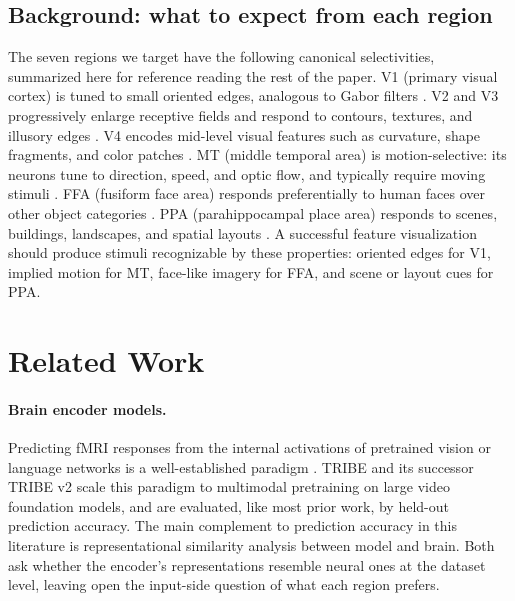 \documentclass{article}
\begin{document}
\subsection{Background: what to expect from each region}
The seven regions we target have the following canonical selectivities, summarized here for reference reading the rest of the paper. V1 (primary visual cortex) is tuned to small oriented edges, analogous to Gabor filters \citep{hubel1962receptive}. V2 and V3 progressively enlarge receptive fields and respond to contours, textures, and illusory edges \citep{hegde2000selectivity}. V4 encodes mid-level visual features such as curvature, shape fragments, and color patches \citep{pasupathy2002population}. MT (middle temporal area) is motion-selective: its neurons tune to direction, speed, and optic flow, and typically require moving stimuli \citep{maunsell1983functional,born2005structure}. FFA (fusiform face area) responds preferentially to human faces over other object categories \citep{kanwisher1997fusiform}. PPA (parahippocampal place area) responds to scenes, buildings, landscapes, and spatial layouts \citep{epstein1998cortical}. A successful feature visualization should produce stimuli recognizable by these properties: oriented edges for V1, implied motion for MT, face-like imagery for FFA, and scene or layout cues for PPA.

\section{Related Work}

\paragraph{Brain encoder models.} Predicting fMRI responses from the internal activations of pretrained vision or language networks is a well-established paradigm \citep{yamins2016goaldriven,schrimpf2020brainscore}. TRIBE \citep{tribev1} and its successor TRIBE v2 \citep{tribev2} scale this paradigm to multimodal pretraining on large video foundation models, and are evaluated, like most prior work, by held-out prediction accuracy. The main complement to prediction accuracy in this literature is representational similarity analysis between model and brain. Both ask whether the encoder's representations resemble neural ones at the dataset level, leaving open the input-side question of what each region prefers.
\end{document}

